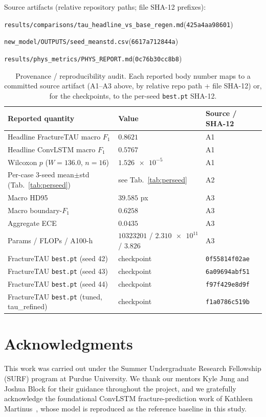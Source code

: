 \documentclass[11pt]{article}
\begin{document}
\noindent Source artifacts (relative repository paths; file SHA-12 prefixes):
\begin{description}
  \setlength{\itemsep}{0pt}
  \item[A1] \nolinkurl{results/comparisons/tau_headline_vs_base_regen.md}\quad(\texttt{425a4aa98601})
  \item[A2] \nolinkurl{new_model/OUTPUTS/seed_meanstd.csv}\quad(\texttt{6617a712844a})
  \item[A3] \nolinkurl{results/phys_metrics/PHYS_REPORT.md}\quad(\texttt{0c76b30cc8b8})
\end{description}

\begin{table}[hb]
\centering
\caption{Provenance / reproducibility audit. Each reported body number maps to a
committed source artifact (A1--A3 above, by relative repo path + file SHA-12) or,
for the checkpoints, to the per-seed \texttt{best.pt} SHA-12.}
\label{tab:provenance}
\small
\begin{tabular}{lll}
\toprule
Reported quantity & Value & Source / SHA-12 \\
\midrule
Headline FractureTAU macro $F_1$ & $0.8621$ & A1 \\
Headline ConvLSTM macro $F_1$    & $0.5767$ & A1 \\
Wilcoxon $p$ ($W{=}136.0$, $n{=}16$) & $\num{1.526e-5}$ & A1 \\
Per-case 3-seed mean$\pm$std (Tab.~\ref{tab:perseed}) & see Tab.~\ref{tab:perseed} & A2 \\
Macro HD95 & $39.585$ px & A3 \\
Macro boundary-$F_1$ & $0.6258$ & A3 \\
Aggregate ECE & $0.0435$ & A3 \\
Params / FLOPs / A100-h & $\num{10323201}$ / $\num{2.310e11}$ / $3.826$ & A3 \\
\midrule
FractureTAU \texttt{best.pt} (seed 42) & checkpoint & \texttt{0f55814f02ae} \\
FractureTAU \texttt{best.pt} (seed 43) & checkpoint & \texttt{6a09694abf51} \\
FractureTAU \texttt{best.pt} (seed 44) & checkpoint & \texttt{f97f429e8d9f} \\
FractureTAU \texttt{best.pt} (tuned, tau\_refined) & checkpoint & \texttt{f1a0786c519b} \\
\bottomrule
\end{tabular}
\end{table}

\section*{Acknowledgments}
This work was carried out under the Summer Undergraduate Research Fellowship
(SURF) program at Purdue University. We thank our mentors Kyle Jung and Joshua
Block for their guidance throughout the project, and we gratefully acknowledge
the foundational ConvLSTM fracture-prediction work of Kathleen
Martinus~\citep{martinus2024thesis}, whose model is reproduced as the reference
baseline in this study.

\clearpage


\end{document}
